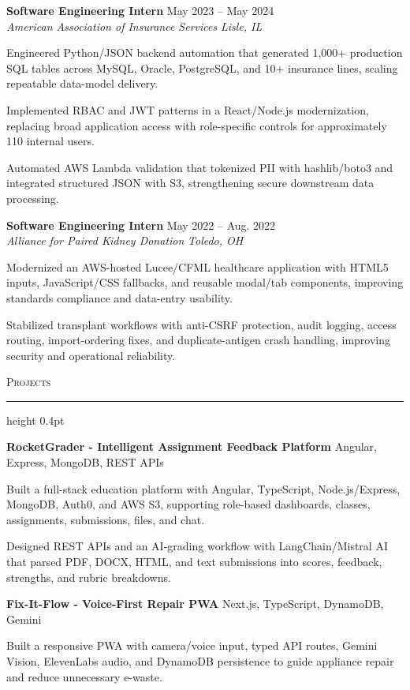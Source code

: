 \documentclass[letterpaper,11pt]{article}
\newcommand{\resumesection}[1]{%
  \par\vspace{2pt}%
  {\large\scshape #1}\par\vspace{2pt}%
  \hrule height 0.4pt\vspace{2pt}%
}
\newcommand{\resumeSubheading}[4]{
  \textbf{#1} \hfill #2\\
  \textit{#3} \hfill \textit{#4}
}
\newcommand{\projectHeading}[2]{
  \textbf{#1} \hfill #2
}
\begin{document}
\resumeSubheading
{Software Engineering Intern}{May 2023 -- May 2024}
{American Association of Insurance Services}{Lisle, IL}
\begin{tightitemize}
  \item Engineered Python/JSON backend automation that generated 1,000+ production SQL tables across MySQL, Oracle, PostgreSQL, and 10+ insurance lines, scaling repeatable data-model delivery.
  \item Implemented RBAC and JWT patterns in a React/Node.js modernization, replacing broad application access with role-specific controls for approximately 110 internal users.
  \item Automated AWS Lambda validation that tokenized PII with hashlib/boto3 and integrated structured JSON with S3, strengthening secure downstream data processing.
\end{tightitemize}

\resumeSubheading
{Software Engineering Intern}{May 2022 -- Aug. 2022}
{Alliance for Paired Kidney Donation}{Toledo, OH}
\begin{tightitemize}
  \item Modernized an AWS-hosted Lucee/CFML healthcare application with HTML5 inputs, JavaScript/CSS fallbacks, and reusable modal/tab components, improving standards compliance and data-entry usability.
  \item Stabilized transplant workflows with anti-CSRF protection, audit logging, access routing, import-ordering fixes, and duplicate-antigen crash handling, improving security and operational reliability.
\end{tightitemize}

\resumesection{Projects}
\projectHeading{RocketGrader - Intelligent Assignment Feedback Platform}{Angular, Express, MongoDB, REST APIs}
\begin{tightitemize}
  \item Built a full-stack education platform with Angular, TypeScript, Node.js/Express, MongoDB, Auth0, and AWS S3, supporting role-based dashboards, classes, assignments, submissions, files, and chat.
  \item Designed REST APIs and an AI-grading workflow with LangChain/Mistral AI that parsed PDF, DOCX, HTML, and text submissions into scores, feedback, strengths, and rubric breakdowns.
\end{tightitemize}

\projectHeading{Fix-It-Flow - Voice-First Repair PWA}{Next.js, TypeScript, DynamoDB, Gemini}
\begin{tightitemize}
  \item Built a responsive PWA with camera/voice input, typed API routes, Gemini Vision, ElevenLabs audio, and DynamoDB persistence to guide appliance repair and reduce unnecessary e-waste.
\end{tightitemize}
\end{document}
